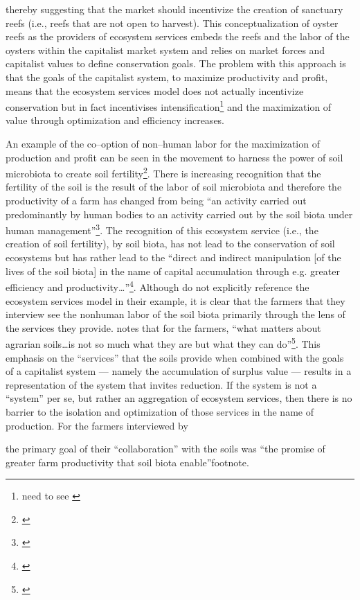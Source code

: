 \documentclass{article}
\begin{document}
thereby suggesting that the market should incentivize the creation of sanctuary reefs (i.e., reefs that are not open to harvest). This conceptualization of oyster reefs as the providers of ecosystem services embeds the reefs and the labor of the oysters within the capitalist market system and relies on market forces and capitalist values to define conservation goals. The problem with this approach is that the goals of the capitalist system, to maximize productivity and profit, means that the ecosystem services model does not actually incentivize conservation but in fact incentivises intensification\footnote{need to see \cite{bommarco_ecological_2013}} and the maximization of value through optimization and efficiency increases. 

An example of the co--option of non--human labor for the maximization of production and profit can be seen in the movement to harness the power of soil microbiota to create soil fertility\footnote{\cite{krz_nonhuman_2020}}. There is increasing recognition that the fertility of the soil is the result of the labor of soil microbiota and therefore the productivity of a farm has changed from being ``an activity carried out predominantly by human bodies to an activity carried out by the soil biota under human management''\footnote{\cite[p. ?]{krz_nonhuman_2020}}. The recognition of this ecosystem service (i.e., the creation of soil fertility), by soil biota, has not lead to the conservation of soil ecosystems but has rather lead to the ``direct and indirect manipulation [of the lives of the soil biota] in the name of capital accumulation through e.g. greater efficiency and productivity\ldots''\footnote{\cite[p. 239]{krz_nonhuman_2020}}. Although \citeauthor{krz_nonhuman_2020} do not explicitly reference the ecosystem services model in their example, it is clear that the farmers that they interview see the nonhuman labor of the soil biota primarily through the lens of the services they provide. \citeauthor{krz_nonhuman_2020} notes that for the farmers, ``what matters about agrarian soils\ldots is not so much what they are but what they can do''\footnote{\cite[p. 234]{krz_nonhuman_2020}}. This emphasis on the ``services'' that the soils provide when combined with the goals of a capitalist system --- namely the accumulation of surplus value --- results in a representation of the system that invites reduction. If the system is not a ``system'' per se, but rather an aggregation of ecosystem services, then there is no barrier to the isolation and optimization of those services in the name of production. For the farmers interviewed by {\cite{krz_nonhuman_2020} the primary goal of their ``collaboration'' with the soils was ``the promise of greater farm productivity that soil biota enable''footnote{\cite[p. 243]{krz_nonhuman_2020}}.

}
\end{document}
